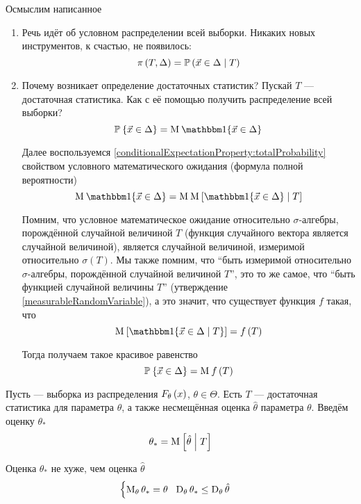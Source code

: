 Осмыслим написанное
\begin{enumerate}
  \item Речь идёт об условном распределении всей выборки.
      Никаких новых инструментов, к счастью, не появилось:
      $$\pi\left( T, \Delta \right)
      = \mathbb{P}\left( \vec{x} \in \Delta \;\middle|\; T \right)$$
  \item Почему возникает определение достаточных статистик?
      Пускай $T$ --- достаточная статистика.
      Как с её помощью получить распределение всей выборки?
      $$\Probability{\vec{x} \in \Delta}
      = \mean{\Indicator{\vec{x} \in \Delta}}$$

      Далее воспользуемся
      \ref{conditionalExpectationProperty:totalProbability}
      свойством условного математического ожидания
      (формула полной вероятности)
      $$\mean{\Indicator{\vec{x} \in \Delta}}
      = \mean{\Mean{\Indicator{\vec{x} \in \Delta} \mcond T}}$$

      Помним, что условное математическое ожидание
      относительно $\sigma$-алгебры, порождённой случайной величиной $T$
      (функция случайного вектора является случайной величиной),
      является случайной величиной, измеримой
      относительно $\sigma\left( T \right)$.
      Мы также помним, что ``быть измеримой относительно $\sigma$-алгебры,
      порождённой случайной величиной $T$'', это то же самое, что
      ``быть функцией случайной величины $T$''
      (утверждение \ref{measurableRandomVariable}), а это значит,
      что существует функция $f$ такая, что
      $$\Mean{\Indicator{\vec{x} \in \Delta \mcond T}} = f\left( T \right)$$

      Тогда получаем такое красивое равенство
      $$\mathbb{P}_{{}}\left\{ \vec{x} \in \Delta \right\} = \operatorname{M}_{} f\left( T \right)$$
\end{enumerate}

\begin{theorem}
  Пусть \xsample --- выборка из распределения $F_{\theta}\left(x\right)$,
  $\theta \in \Theta$.
  Есть $T$ --- достаточная статистика для параметра $\theta$,
  а также несмещённая оценка $\hat{\theta}$ параметра $\theta$.
  Введём оценку $\theta_*$
  $$\theta_* = \operatorname{M}_{} \left[ \hat{\theta} \;\middle|\; T \right]$$

  Оценка $\theta_*$ не хуже, чем оценка $\hat{\theta}$
  $$\begin{cases}
      \operatorname{M}_{\theta} \theta_* = \theta \ \
      \operatorname{D}_{\theta} \theta_* \le \operatorname{D}_{\theta} \hat{\theta}
  \end{cases}$$
\end{theorem}

